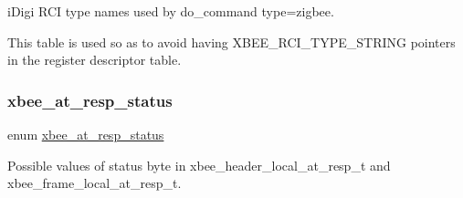 i\+Digi R\+CI type names used by do\+\_\+command type=zigbee. 

This table is used so as to avoid having X\+B\+E\+E\+\_\+\+R\+C\+I\+\_\+\+T\+Y\+P\+E\+\_\+\+S\+T\+R\+I\+NG pointers in the register descriptor table. \mbox{\label{group__xbee__atcmd_gac6a27f1b1ee32b75b6f966afbb347f22}} 
\subsubsection{\texorpdfstring{xbee\+\_\+at\+\_\+resp\+\_\+status}{xbee\_at\_resp\_status}}
{\footnotesize\ttfamily enum \hyperlink{group__xbee__atcmd_gac6a27f1b1ee32b75b6f966afbb347f22}{xbee\+\_\+at\+\_\+resp\+\_\+status}}



Possible values of {\ttfamily status} byte in xbee\+\_\+header\+\_\+local\+\_\+at\+\_\+resp\+\_\+t and xbee\+\_\+frame\+\_\+local\+\_\+at\+\_\+resp\+\_\+t. 

